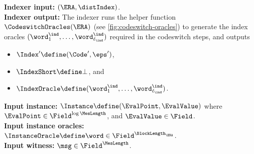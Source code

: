     \begin{tcolorbox}[breakable, enhanced, colback=white, boxrule=0.65pt]
        \textbf{Indexer input: } $(\ERA, \distIndex)$.\\
        \textbf{Indexer output: } The indexer runs the helper function $\CodeswitchOracles(\ERA)$ (see \cref{fig:codeswitch-oracles}) to generate the index oracles $(\word^{\ind}_1, \dotsc, \word^{\ind}_{\ell_{\ind}})$ required in the codeswitch steps, and outputs
        \begin{itemize}[nosep]
            \item $\Index' \define (\Code',\eps')$,
            \item $\IndexShort \define \bot$, and
            \item $\IndexOracle \define (\word^{\ind}_1, \dotsc, \word^{\ind}_{\ell_{\ind}})$.
        \end{itemize}
    \end{tcolorbox}
    \vspace{-13.72pt}
    \begin{tcolorbox}[breakable, enhanced, colback=white, boxrule=0.65pt]
        \textbf{Input instance: } $\Instance \define (\EvalPoint, \EvalValue)$ where $\EvalPoint \in \Field^{\log \MesLength}$, and $\EvalValue \in \Field$.\\
        \textbf{Input instance oracles: } $\InstanceOracle \define \word \in \Field^{\BlockLength_\ERA}$.\\
        \textbf{Input witness: } $\msg \in \Field^{\MesLength}$.
    \end{tcolorbox}
    \vspace{-13.72pt}
